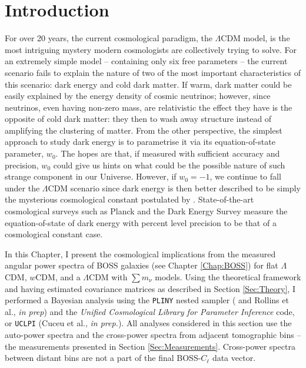 \section{Introduction}
For over 20 years, the current cosmological paradigm, the $\Lambda$CDM model, is the most intriguing mystery modern cosmologists are collectively trying to solve. For an extremely simple model -- containing only six free parameters -- the current scenario fails to explain the nature of two of the most important characteristics of this scenario: dark energy and cold dark matter. If warm, dark matter could be easily explained by the energy density of cosmic neutrinos; however, since neutrinos, even having non-zero mass, are relativistic the effect they have is the opposite of cold dark matter: they then to wash away structure instead of amplifying the clustering of matter. From the other perspective, the simplest approach to study dark energy is to parametrise it via its equation-of-state parameter, $w_0$. The hopes are that, if measured with sufficient accuracy and precision, $w_0$ could give us hints on what could be the possible nature of such strange component in our Universe. However, if $w_0 = -1$, we continue to fall under the $\Lambda$CDM scenario since dark energy is then better described to be simply the mysterious cosmological constant postulated by \cite{1917Einstein}. State-of-the-art cosmological surveys such as Planck \citep{PlanckCosmology2016,2018PlanckCosmology} and the Dark Energy Survey \citep{2017arXiv170801530D,2018DES-SNe} measure the equation-of-state of dark energy with percent level precision to be that of a cosmological constant case.

\qquad In this Chapter, I present the cosmological implications from the measured angular power spectra of BOSS galaxies (see Chapter \ref{Chap:BOSS}) for flat $\Lambda$CDM, $w$CDM, and a $\Lambda$CDM with $\sum m_{\nu}$ models. Using the theoretical framework and having estimated covariance matrices as described in Section \ref{Sec:Theory}, I performed a Bayesian analysis using the \texttt{PLINY} nested sampler ( \citealt{PlinyRichardThesis} and Rollins et al., \textit{in prep}) and the \textit{Unified Cosmological Library for Parameter Inference} code, or \texttt{UCLPI} (Cuceu et al., \textit{in prep.}). All analyses considered in this section use the auto-power spectra and the cross-power spectra from adjacent tomographic bins -- the measurements presented in Section \ref{Sec:Measurements}. Cross-power spectra between distant bins are not a part of the final BOSS-$C_{\ell}$ data vector.

